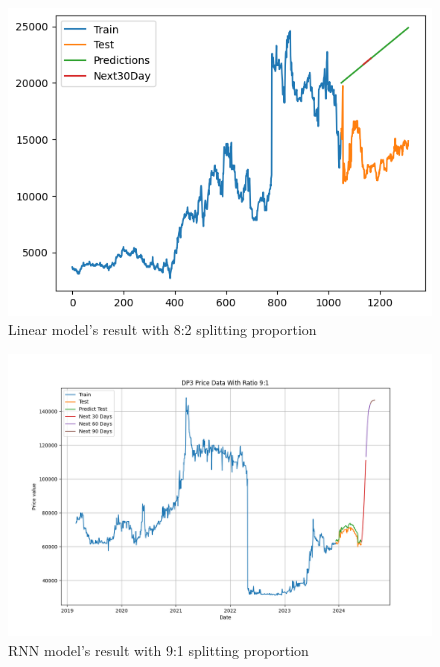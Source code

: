 \documentclass{ieeeojies}
\begin{document}
\vspace{-1em}

\begin{figure}[H]
  \centering
  \begin{minipage}{0.8\linewidth}
    \centering
    \includegraphics[width=\linewidth]{bibliography/Figure/LN_DP3(8_2).png}
    \caption{Linear model's result with 8:2 splitting proportion}
    \label{fig8}
  \end{minipage}
\end{figure}

\vspace{-1em}

\begin{figure}[H]
  \centering
  \begin{minipage}{0.8\linewidth}
    \centering
    \includegraphics[width=\linewidth]{bibliography/Figure/RNN_91_DP3.png}
    \caption{RNN model's result with 9:1 splitting proportion}
    \label{fig8}
  \end{minipage}
\end{figure}
\end{document}
